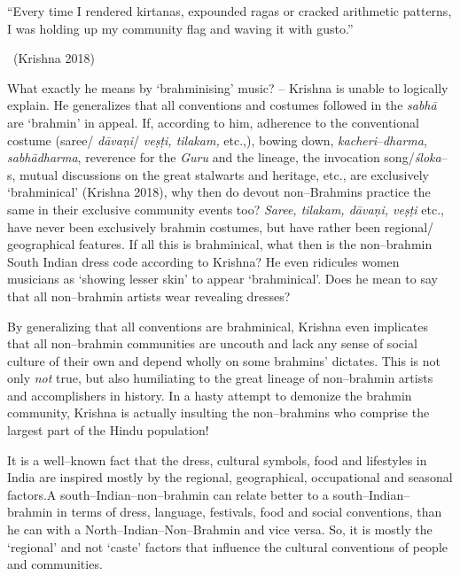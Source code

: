 \begin{myquote}
“Every time I rendered kirtanas, expounded ragas or cracked arithmetic patterns, I was holding up my community flag and waving it with gusto.” 

~\hfill (Krishna 2018)
\end{myquote}

What exactly he means by ‘brahminising’ music? – Krishna is unable to logically explain. He generalizes that all conventions and costumes followed in the \textit{sabhā} are ‘brahmin’ in appeal. If, according to him, adherence to the conventional costume (saree/ \textit{dāvaṇi}/ \textit{veṣṭi, tilakam,} etc.,), bowing down, \textit{kacheri}–\textit{dharma}, \textit{sabhā}\textit{dharma}, reverence for the \textit{Guru} and the lineage, the invocation song/\textit{śloka}–s, mutual discussions on the great stalwarts and heritage, etc., are exclusively ‘brahminical’ (Krishna 2018), why then do devout non–Brahmins practice the same in their exclusive community events too? \textit{Saree, tilakam, dāvaṇi, veṣṭi} etc., have never been exclusively brahmin costumes, but have rather been regional/ geographical features. If all this is brahminical, what then is the non–brahmin South Indian dress code according to Krishna? He even ridicules women musicians as ‘showing lesser skin’ to appear ‘brahminical’. Does he mean to say that all non–brahmin artists wear revealing dresses?

By generalizing that all conventions are brahminical, Krishna even implicates that all non–brahmin communities are uncouth and lack any sense of social culture of their own and depend wholly on some brahmins’ dictates. This is not only \textit{not} true, but also humiliating to the great lineage of non–brahmin artists and accomplishers in history. In a hasty attempt to demonize the brahmin community, Krishna is actually insulting the non–brahmins who comprise the largest part of the Hindu population!

It is a well–known fact that the dress, cultural symbols, food and lifestyles in India are inspired mostly by the regional, geographical, occupational and seasonal factors.A south–Indian–non–brahmin can relate better to a south–Indian–brahmin in terms of dress, language, festivals, food and social conventions, than he can with a North–Indian–Non–Brahmin and vice versa. So, it is mostly the ‘regional’ and not ‘caste’ factors that influence the cultural conventions of people and communities.

